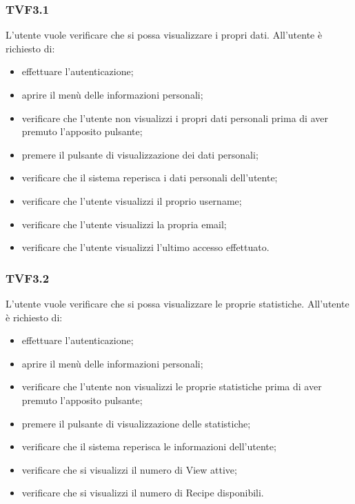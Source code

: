 		\subsubsection{TVF3.1}
			L'utente vuole verificare che si possa visualizzare i propri dati. All'utente è richiesto di:
			\begin{itemize}
				\item effettuare l'autenticazione;
				\item aprire il menù delle informazioni personali;
				\item verificare che l'utente non visualizzi i propri dati personali prima di aver premuto l'apposito pulsante; 
				\item premere il pulsante di visualizzazione dei dati personali;
				\item verificare che il sistema reperisca i dati personali dell'utente;
				\item verificare che l'utente visualizzi il proprio username;
				\item verificare che l'utente visualizzi la propria email;
				\item verificare che l'utente visualizzi l'ultimo accesso effettuato.
			\end{itemize}
			
		\subsubsection{TVF3.2}
			L'utente vuole verificare che si possa visualizzare le proprie statistiche. All'utente è richiesto di:
			\begin{itemize}
				\item effettuare l'autenticazione;
				\item aprire il menù delle informazioni personali;
				\item verificare che l'utente non visualizzi le proprie statistiche prima di aver premuto l'apposito pulsante; 
				\item premere il pulsante di visualizzazione delle statistiche;
				\item verificare che il sistema reperisca le informazioni dell'utente;
				\item verificare che si visualizzi il numero di View attive;
				\item verificare che si visualizzi il numero di Recipe disponibili.
			\end{itemize}
			
